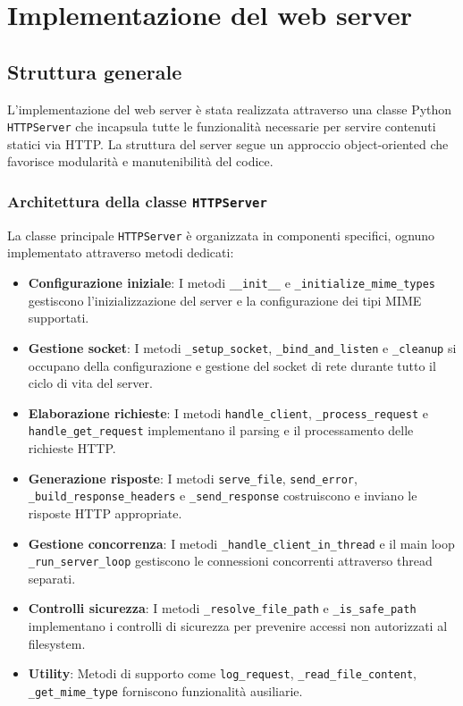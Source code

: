 \documentclass[a4paper,12pt]{report}
\begin{document}
\chapter{Implementazione del web server}

\section{Struttura generale}

L'implementazione del web server è stata realizzata attraverso una classe Python \texttt{HTTPServer} che incapsula tutte le funzionalità necessarie per servire contenuti statici via HTTP. 
La struttura del server segue un approccio object-oriented che favorisce modularità e manutenibilità del codice.

\subsection{Architettura della classe \texttt{HTTPServer}}

La classe principale \texttt{HTTPServer} è organizzata in componenti specifici, ognuno implementato attraverso metodi dedicati:

\begin{itemize}
    \item \textbf{Configurazione iniziale}: I metodi \texttt{\_\_init\_\_} e \texttt{\_initialize\_mime\_types} gestiscono l'inizializzazione del server e la configurazione dei tipi MIME supportati.
    \item \textbf{Gestione socket}: I metodi \texttt{\_setup\_socket}, \texttt{\_bind\_and\_listen} e \texttt{\_cleanup} si occupano della configurazione e gestione del socket di rete durante tutto il ciclo di vita del server.
    \item \textbf{Elaborazione richieste}: I metodi \texttt{handle\_client}, \texttt{\_process\_request} e \texttt{handle\_get\_request} implementano il parsing e il processamento delle richieste HTTP.
    \item \textbf{Generazione risposte}: I metodi \texttt{serve\_file}, \texttt{send\_error}, \texttt{\_build\_response\_headers} e \texttt{\_send\_response} costruiscono e inviano le risposte HTTP appropriate.
    \item \textbf{Gestione concorrenza}: I metodi \texttt{\_handle\_client\_in\_thread} e il main loop \texttt{\_run\_server\_loop} gestiscono le connessioni concorrenti attraverso thread separati.
    \item \textbf{Controlli sicurezza}: I metodi \texttt{\_resolve\_file\_path} e \texttt{\_is\_safe\_path} implementano i controlli di sicurezza per prevenire accessi non autorizzati al filesystem.
    \item \textbf{Utility}: Metodi di supporto come \texttt{log\_request}, \texttt{\_read\_file\_content}, \texttt{\_get\_mime\_type} forniscono funzionalità ausiliarie.
\end{itemize}
\end{document}
